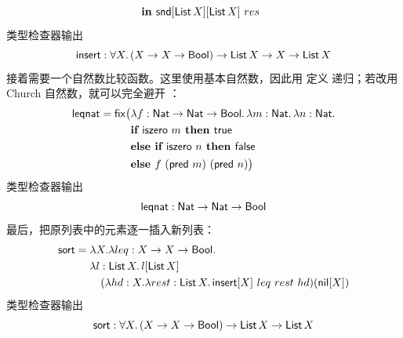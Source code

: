 \begin{taplauthorsolutionentrybox}
\[\begin{aligned}
&\textbf{ in }\mathsf{snd}[\mathsf{List}\,X][\mathsf{List}\,X]\ res
\end{aligned}
\]
类型检查器输出
\[
\mathsf{insert}:
\forall X.\,(X\to X\to\mathsf{Bool})\to
\mathsf{List}\,X\to X\to\mathsf{List}\,X
\]
接着需要一个自然数比较函数。这里使用基本自然数，因此用  定义
递归；若改用 Church 自然数，就可以完全避开 ：
\[
\begin{aligned}
\mathsf{leqnat}=\mathsf{fix}\bigl(&\lambda f:
 \mathsf{Nat}\to\mathsf{Nat}\to\mathsf{Bool}.\,
 \lambda m:\mathsf{Nat}.\,\lambda n:\mathsf{Nat}.\\
&\textbf{if }\mathsf{iszero}\ m\textbf{ then }\mathsf{true}\\
&\textbf{else if }\mathsf{iszero}\ n\textbf{ then }\mathsf{false}\\
&\textbf{else }f\ (\mathsf{pred}\ m)\ (\mathsf{pred}\ n)\bigr)
\end{aligned}
\]
类型检查器输出
\[
\mathsf{leqnat}:\mathsf{Nat}\to\mathsf{Nat}\to\mathsf{Bool}
\]
最后，把原列表中的元素逐一插入新列表：
\[
\begin{aligned}
\mathsf{sort}={}&\lambda X.\lambda leq:X\to X\to\mathsf{Bool}.\\
&\lambda l:\mathsf{List}\,X.\,
l[\mathsf{List}\,X]\\
&\quad
(\lambda hd:X.\lambda rest:\mathsf{List}\,X.\,
\mathsf{insert}[X]\ leq\ rest\ hd)(\mathsf{nil}[X])
\end{aligned}
\]
类型检查器输出
\[
\mathsf{sort}:
\forall X.\,(X\to X\to\mathsf{Bool})\to
\mathsf{List}\,X\to\mathsf{List}\,X
\]


\end{taplauthorsolutionentrybox}
